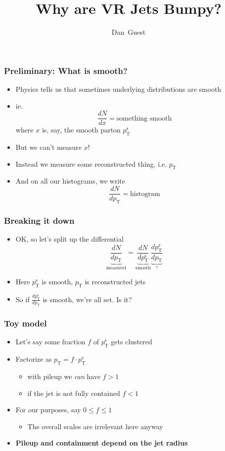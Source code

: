 \documentclass[xcolor={table}]{beamer}
\title{Why are VR Jets Bumpy?}
\author[dguest@cern.ch]{Dan~Guest}
\institute[UCI]{UC~Irvine}
\newcommand{\pt}{p_{\mathrm{T}}}
\newcommand{\ptr}{\pt}
\newcommand{\ptt}{\pt^{\text{s}}}
\begin{document}
\begin{frame}
  \maketitle
\end{frame}

\begin{frame}
  \frametitle{Preliminary: What is smooth?}
  \begin{itemize}
  \item Physics tells us that sometimes underlying distributions are smooth
  \item ie.
    \[ \frac{dN}{dx} = \text{something smooth} \]
    where $x$ is, say, the smooth parton $\ptt$
  \item But we can't measure $x$!
  \item Instead we measure some reconstructed thing, i.e. $\ptr$
  \item And on all our histograms, we write
    \[ \frac{dN}{d\ptr} = \text{histogram} \]
  \end{itemize}
\end{frame}

\begin{frame}
  \frametitle{Breaking it down}
  \begin{itemize}
  \item OK, so let's split up the differential
    \[ \underbrace{\frac{dN}{d\ptr}}_{\text{measured}} = \underbrace{\frac{dN}{d\ptt}}_{\text{smooth}} \underbrace{\frac{d\ptt}{d\ptr}}_{?} \]
  \item Here $\ptt$ is smooth, $\ptr$ is reconstructed jets
  \item So if $\frac{d\ptt}{d\ptr}$ is smooth, we're all set. Is it?
  \end{itemize}
\end{frame}
\begin{frame}
  \frametitle{Toy model}
  \begin{itemize}
  \item Let's say some fraction $f$ of $\ptt$ gets clustered
  \item Factorize as $\ptr = f \cdot \ptt$
    \begin{itemize}
    \item with pileup we \emph{can} have $f > 1$
    \item if the jet is not fully contained $f < 1$
    \end{itemize}
  \item For our purposes, say $0 \leq f \leq 1$
    \begin{itemize}
    \item The overall scales are irrelevant here anyway
    \end{itemize}
  \item \textbf{Pileup and containment depend on the jet radius}
  \end{itemize}
\end{frame}
\end{document}

